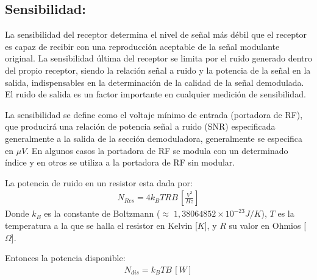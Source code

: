 \documentclass[letterpaper,11pt,spanish]{sphinxmanual}
\begin{document}
\subsection{Sensibilidad:}
\label{\detokenize{introduccion/sistemas:Sensibilidad:}}
La sensibilidad del receptor determina el nivel de señal más débil que el receptor es capaz de recibir con una reproducción aceptable de la señal modulante original. La sensibilidad última del receptor se limita por el ruido generado dentro del propio receptor, siendo la relación señal a ruido y la potencia de la señal en la salida, indispensables en la determinación de la calidad de la señal demodulada. El ruido de salida es un factor importante en cualquier medición de sensibilidad.

La sensibilidad se define como el voltaje mínimo de entrada (portadora de RF), que producirá una relación de potencia señal a ruido (SNR) especificada generalmente a la salida de la sección demoduladora, generalmente se especifica en \(\mu V\). En algunos casos la portadora de RF se modula con un determinado índice y en otros se utiliza a la portadora de RF sin modular.

La potencia de ruido en un resistor esta dada por:
\begin{equation*}
\begin{split}N_{Res} = 4 k_B T R B\,[\frac{V^2}{Hz}]\end{split}
\end{equation*}
Donde \(k_B\) es la constante de Boltzmann (\(\approx \; 1,38064852 \times 10^{-23} J/K\)), \(T\) es la temperatura a la que se halla el resistor en Kelvin {[}\(K\){]}, y \(R\) su valor en Ohmios {[}\(\Omega\){]}.

Entonces la potencia disponible:
\begin{equation*}
\begin{split}N_{dis} = k_B T B\,[W]\end{split}
\end{equation*}
\end{document}
